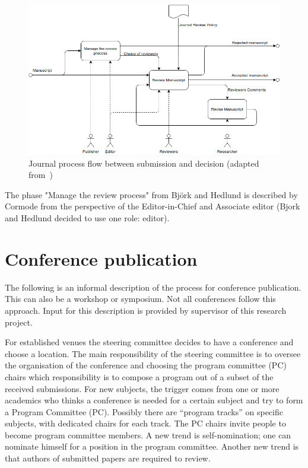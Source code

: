 \documentclass{ou-report}
\newcommand{\todo}[1]{{\color{red} TODO: #1}}
\begin{document}
\begin{figure}[H]
\centering
\includegraphics[width=14cm]{images/bh2004_dia_a22331_part.drawio.png}
\caption{Journal process flow between submission and decision (adapted
from~\cite[diagram A22331]{BH2004})}
\label{fig:bh2004_a22331}
\end{figure}
The phase "Manage the review process" from Bj\"ork and Hedlund is described by 
Cormode from the perspective of the Editor-in-Chief and Associate editor (Bjork 
and Hedlund decided to use one role: editor). 




\section{Conference publication}
The following is an informal description of the process for conference 
publication. This can also be a workshop or symposium. Not all conferences 
follow this approach. Input for this description is provided by supervisor of
this research project.

For established venues the steering committee decides to have a conference and 
choose a location. The main responsibility of the steering committee is to 
oversee the organisation of the conference and choosing the program 
committee (PC) chairs which responsibility is to compose a program out of a 
subset of the received 
submissions. For new subjects, the trigger comes from one or more 
academics who thinks a conference is needed for a certain subject and try to 
form a Program Committee (PC). Possibly there are ``program tracks'' on specific 
subjects, with dedicated chairs for each track.
The PC chairs invite people to become program 
committee members. A new trend is self-nomination; one can nominate himself for 
a position in the program committee. Another new trend is that authors of 
submitted papers are required to review.
\end{document}
